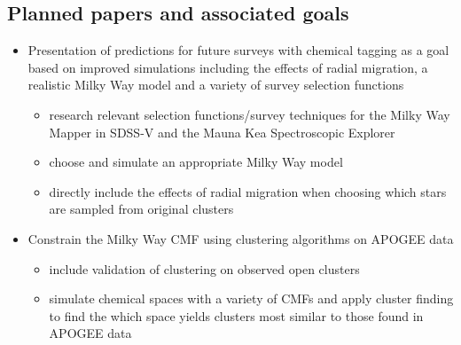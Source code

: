 \documentclass[11pt]{article}
\begin{document}
\subsection*{Planned papers and associated goals}
\begin{itemize}
	\item Presentation of predictions for future surveys with chemical tagging as a goal based on improved simulations including the effects of radial migration, a realistic Milky Way model and a variety of survey selection functions
	\begin{itemize}
	\item research relevant selection functions/survey techniques for the Milky Way Mapper in SDSS-V \citep{Kollmeier2017} and the Mauna Kea Spectroscopic Explorer \citep{Zhang2018}
	\item choose and simulate an appropriate Milky Way model
	\item directly include the effects of radial migration when choosing which stars are sampled from original clusters
	\end{itemize}
	\item Constrain the Milky Way CMF using clustering algorithms on APOGEE data
	\begin{itemize}
	\item include validation of clustering on observed open clusters
	\item simulate chemical spaces with a variety of CMFs and apply cluster finding to find the which space yields clusters most similar to those found in APOGEE data
	\end{itemize}
\end{itemize}


\end{document}
